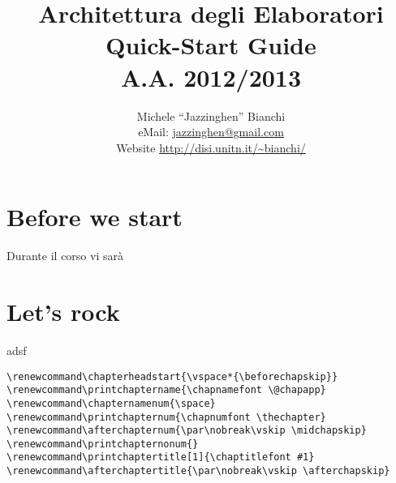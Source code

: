 \documentclass[a4paper]{memoir}
\title{Architettura degli Elaboratori \\ Quick-Start Guide \\ A.A. 2012/2013}
\author{Michele ``Jazzinghen'' Bianchi \\ eMail: \url{jazzinghen@gmail.com} \\%
	Website \url{http://disi.unitn.it/~bianchi/}}
\makeatletter
\newcommand\feline@chapter@marker[1][4cm]{%
	\sbox\feline@chapter{%
	\resizebox{!}{#1}{\fboxsep=1pt%
	\colorbox{nicered}{\color{white}\bfseries\sffamily\thechapter}%
	}}%
	\rotatebox{90}{%
	\resizebox{%
	\heightof{\usebox{\feline@chapter}}+\depthof{\usebox{\feline@chapter}}}%
	{!}{\scshape\so\@chapapp}}\quad%
	\raisebox{\depthof{\usebox{\feline@chapter}}}{\usebox{\feline@chapter}}%
}
\newcommand\feline@chm[1][4cm]{%
\sbox\feline@chapter{\feline@chapter@marker[#1]}%
\makebox[0pt][l]{%
\makebox[1cm][r]{\usebox\feline@chapter}%
}}
\renewcommand\chapnamefont{\normalfont\Large\scshape\raggedleft\so}
\renewcommand\chaptitlefont{\normalfont\huge\bfseries\scshape\color{nicered}}
\renewcommand\chapternamenum{}
\renewcommand\printchaptername{}
\renewcommand\printchapternum{\null\hfill\feline@chm[2.5cm]\par}
\renewcommand\afterchapternum{\par\vskip\midchapskip}
\renewcommand\printchaptertitle[1]{\chaptitlefont\raggedleft ##1\par}
\makeatother
\begin{document}
\maketitle

\chapter*{Before we start}

	Durante il corso vi sarà

\chapter{Let's rock}
adsf

\begin{Verbatim}[label=test]
\renewcommand\chapterheadstart{\vspace*{\beforechapskip}}
\renewcommand\printchaptername{\chapnamefont \@chapapp}
\renewcommand\chapternamenum{\space}
\renewcommand\printchapternum{\chapnumfont \thechapter}
\renewcommand\afterchapternum{\par\nobreak\vskip \midchapskip}
\renewcommand\printchapternonum{}
\renewcommand\printchaptertitle[1]{\chaptitlefont #1}
\renewcommand\afterchaptertitle{\par\nobreak\vskip \afterchapskip}
\end{Verbatim}
\end{document}
